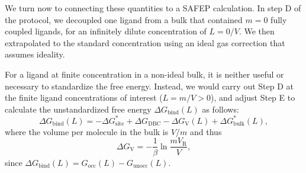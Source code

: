 \documentclass[9pt,tutorial]{Styling/livecoms}
\begin{document}
We turn now to connecting these quantities to a SAFEP calculation.  In step D of the protocol, we decoupled one ligand from a bulk that contained $m=0$ fully coupled ligands, for an infinitely dilute concentration of $L=0/V$. We then extrapolated to the standard concentration using an ideal gas correction that assumes ideality.

For a ligand at finite concentration in a non-ideal bulk, it is neither useful or necessary to standardize the free energy. Instead, we would carry out Step D at the finite ligand concentrations of interest ($L=m/V>0$), and adjust Step E to calculate the unstandardized free energy $\Delta G_\mathrm{bind}(L)$ as follows: 
\begin{equation}
\Delta G_\mathrm{bind}(L)= - \Delta G_\mathrm{site}^* + \Delta G_\mathrm{DBC} -\Delta G_\mathrm{V}(L)+ \Delta G^*_\mathrm{bulk}(L),
\end{equation} 
where the volume per molecule in the bulk is $V/m$ and thus \begin{equation}
\label{eq:idealGas}
    \Delta G_\mathrm{V}= -\frac{1}{\beta} \ln \frac{m V_\mathrm{R}}{V}, 
\end{equation}
since
    $\Delta G_\mathrm{bind}(L) = G_\mathrm{occ}(L) - G_\mathrm{unocc}(L)$.
\end{document}
